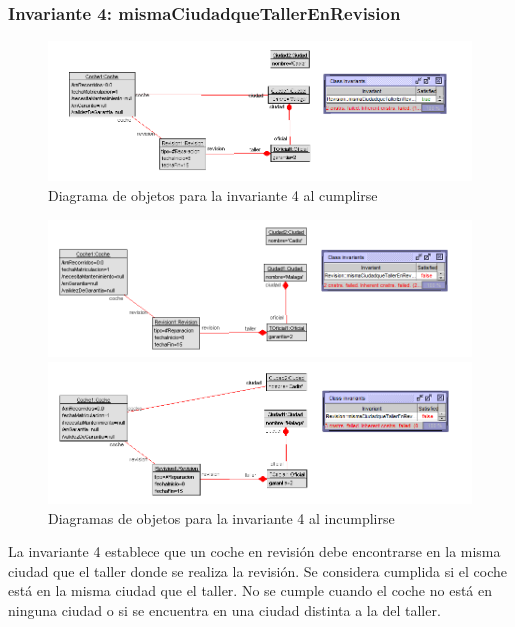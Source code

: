 \documentclass[12pt.a4paper]{article}
\begin{document}
\subsubsection{Invariante 4: mismaCiudadqueTallerEnRevision}
    \begin{figure}[H]
         \centering
         \includegraphics[width=1\linewidth]{Soils/4.png}
         \caption{Diagrama de objetos para la invariante 4 al cumplirse}
    \end{figure}

    
 \begin{figure}[H]
    \centering
    \begin{minipage}{0.49\textwidth}
        \centering
        \includegraphics[width=1\linewidth]{Soils/4_v2.png}
    \end{minipage}
    \hfill
    \begin{minipage}{0.49\textwidth}
        \centering
        \includegraphics[width=1\linewidth]{Soils/4_v3png.png}
    \end{minipage}
    \caption{Diagramas de objetos para la invariante 4 al incumplirse}
\end{figure}

La invariante 4 establece que un coche en revisión debe encontrarse en la misma ciudad que el taller donde se realiza la revisión. Se considera cumplida si el coche está en la misma ciudad que el taller. No se cumple cuando el coche no está en ninguna ciudad o si se encuentra en una ciudad distinta a la del taller.
\end{document}
